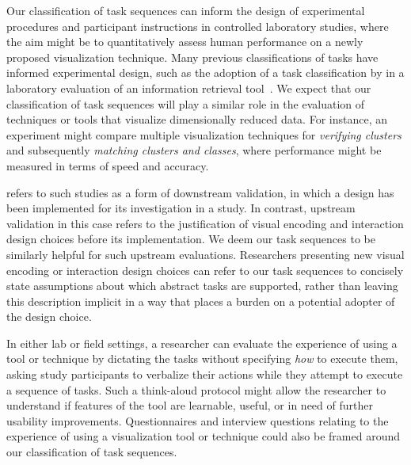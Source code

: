 Our classification of task sequences can inform the design of experimental procedures and participant instructions in controlled laboratory studies, where the aim might be to quantitatively assess human performance on a newly proposed visualization technique.
Many previous classifications of tasks have informed experimental design, such as the adoption of a task classification by \citet{Zhou1998} in a laboratory evaluation of an information retrieval tool~\cite{Morse2000}.
We expect that our classification of task sequences will play a similar role in the evaluation of techniques or tools that visualize dimensionally reduced data. 
For instance, an experiment might compare multiple visualization techniques for {\it verifying clusters} and subsequently {\it matching clusters and classes}, where performance might be measured in terms of speed and accuracy.

\citet{Munzner2009} refers to such studies as a form of downstream validation, in which a design has been implemented for its investigation in a study. 
In contrast, upstream validation in this case refers to the justification of visual encoding and interaction design choices before its implementation. 
We deem our task sequences to be similarly helpful for such upstream evaluations. 
Researchers presenting new visual encoding or interaction design choices can refer to our task sequences to concisely state assumptions about which abstract tasks are supported, rather than leaving this description implicit in a way that places a burden on a potential adopter of the design choice. 

In either lab or field settings, a researcher can evaluate the experience of using a tool or technique by dictating the tasks without specifying {\it how} to execute them, asking study participants to verbalize their actions while they attempt to execute a sequence of tasks. 
Such a think-aloud protocol might allow the researcher to understand if features of the tool are learnable, useful, or in need of further usability improvements.
Questionnaires and interview questions relating to the experience of using a visualization tool or technique could also be framed around our classification of task sequences.

